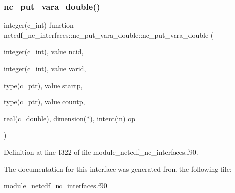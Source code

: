 \subsubsection{\texorpdfstring{nc\+\_\+put\+\_\+vara\+\_\+double()}{nc\_put\_vara\_double()}}
{\footnotesize\ttfamily integer(c\+\_\+int) function netcdf\+\_\+nc\+\_\+interfaces\+::nc\+\_\+put\+\_\+vara\+\_\+double\+::nc\+\_\+put\+\_\+vara\+\_\+double (\begin{DoxyParamCaption}\item[{integer(c\+\_\+int), value}]{ncid,  }\item[{integer(c\+\_\+int), value}]{varid,  }\item[{type(c\+\_\+ptr), value}]{startp,  }\item[{type(c\+\_\+ptr), value}]{countp,  }\item[{real(c\+\_\+double), dimension($\ast$), intent(in)}]{op }\end{DoxyParamCaption})}



Definition at line 1322 of file module\+\_\+netcdf\+\_\+nc\+\_\+interfaces.\+f90.



The documentation for this interface was generated from the following file\+:\begin{DoxyCompactItemize}
\item 
\hyperlink{module__netcdf__nc__interfaces_8f90}{module\+\_\+netcdf\+\_\+nc\+\_\+interfaces.\+f90}\end{DoxyCompactItemize}
